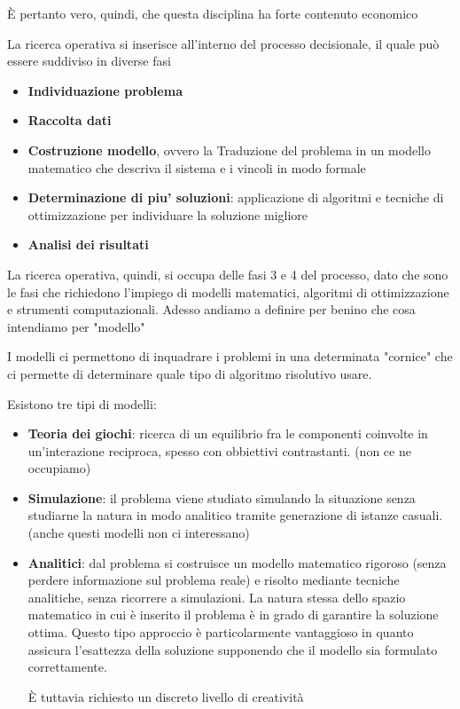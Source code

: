 È pertanto vero, quindi, che questa disciplina ha forte contenuto economico

La ricerca operativa si inserisce all'interno del processo decisionale, il quale può essere suddiviso in diverse fasi
\begin{itemize}
\item \textbf{Individuazione problema}
  \item \textbf{Raccolta dati}
    \item \textbf{Costruzione modello}, ovvero la Traduzione del problema in un modello matematico che descriva il sistema e i vincoli in modo formale
      \item \textbf{Determinazione di piu' soluzioni}: applicazione di algoritmi e tecniche di ottimizzazione per individuare la soluzione migliore 
  \item \textbf{Analisi dei risultati}
\end{itemize}

La ricerca operativa, quindi, si occupa delle fasi 3 e 4 del processo, dato che sono le fasi che richiedono l’impiego di modelli matematici, algoritmi di ottimizzazione e strumenti computazionali. Adesso andiamo a definire per benino che cosa intendiamo per "modello" 

I modelli ci permettono di inquadrare i problemi in una determinata "cornice" che ci permette di determinare quale tipo di algoritmo risolutivo usare.

Esistono tre tipi di modelli:
\begin{itemize}
\item \textbf{Teoria dei giochi}: ricerca di un equilibrio fra le componenti coinvolte in un'interazione reciproca, spesso con obbiettivi contrastanti. (non ce ne occupiamo)
\item \textbf{Simulazione}: il problema viene studiato simulando la situazione senza studiarne la natura in modo analitico tramite generazione di istanze casuali. (anche questi modelli non ci interessano)
\item \textbf{Analitici}: dal problema si costruisce un modello matematico rigoroso (senza perdere informazione sul problema reale) e risolto mediante tecniche analitiche, senza ricorrere a simulazioni. La natura stessa dello spazio matematico in cui è inserito il problema è in grado di garantire la soluzione ottima. Questo tipo approccio è particolarmente vantaggioso in quanto assicura l’esattezza della soluzione supponendo che il modello sia formulato correttamente. 

È tuttavia richiesto un discreto livello di creatività
\end{itemize}

